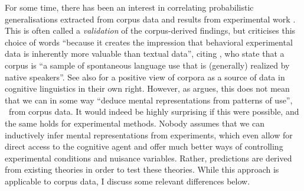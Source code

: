 For some time, there has been an interest in correlating probabilistic generalisations extracted from corpus data and results from experimental work \citep{ArppeJaervikivi2007,BresnanEa2007,BresnanFord2010,DivjakGries2008,DivjakEa2016,FordBresnan2013}.
This is often called a \textit{validation} of the corpus-derived findings, but \citet[303]{Divjak2016a} criticises this choice of words ``because it creates the impression that behavioral experimental data is inherently more valuable than textual data'', citing \cite{TummersEa2005}, who state that a corpus is ``a sample of spontaneous language use that is (generally) realized by native speakers''.
See also \citet{Newman2011} for a positive view of corpora as a source of data in cognitive linguistics in their own right.
However, as \citet[486--487]{Dabrowska2016} argues, this does not mean that we can in some way ``deduce mental representations from patterns of use'', \ie\ from corpus data.
It would indeed be highly surprising if this were possible, and the same holds for experimental methods.
Nobody assumes that we can inductively infer mental representations from experiments, which even allow for direct access to the cognitive agent and offer much better ways of controlling experimental conditions and nuisance variables.
Rather, predictions are derived from existing theories in order to test these theories.
While this approach is applicable to corpus data, I discuss some relevant differences below.

